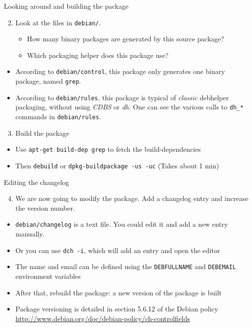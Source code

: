 \documentclass[10pt,final]{beamer}
\begin{document}
\begin{frame}{Looking around and building the package}
	\begin{enumerate}
			\setcounter{enumi}{1}
	\item Look at the files in \texttt{debian/}.
		\begin{itemize}
			\item 		How many binary packages are generated by this source package?
			\item 		Which packaging helper does this package use?
		\end{itemize}
	\end{enumerate}
	\hbr
	\begin{itemize}
		\item According to \texttt{debian/control}, this package only generates one binary package, named \texttt{grep}.
			\hbr
		\item According to \texttt{debian/rules}, this package is typical of \textsl{classic} debhelper packaging, without using \textsl{CDBS} or \textsl{dh}. One can see the various calls to \texttt{dh\_*} commands in \texttt{debian/rules}.
	\end{itemize}
	\hbr
	\begin{enumerate}
			\setcounter{enumi}{2}

		\item Build the package
	\end{enumerate}
	\hbr
	\begin{itemize}
		\item Use \texttt{apt-get build-dep grep} to fetch the build-dependencies
		\item Then \texttt{debuild} or \texttt{dpkg-buildpackage -us -uc} (Takes about 1 min)
	\end{itemize}
\end{frame}

\begin{frame}{Editing the changelog}
	\begin{enumerate}
			\setcounter{enumi}{3}

	\item We are now going to modify the package. Add a changelog entry and increase the version number.
	\end{enumerate}
	\hbr
	\begin{itemize}
		\item \texttt{debian/changelog} is a text file. You could edit it and add a new entry manually.
	\hbr
		\item Or you can use \texttt{dch -i}, which will add an entry and open the editor
	\hbr
		\item The name and email can be defined using the \texttt{DEBFULLNAME} and \texttt{DEBEMAIL} environment variables
	\hbr
		\item After that, rebuild the package: a new version of the package is built
	\hbr
		\item Package versioning is detailed in section 5.6.12 of the Debian policy\\
			\url{http://www.debian.org/doc/debian-policy/ch-controlfields}
	\end{itemize}
\end{frame}
\end{document}
